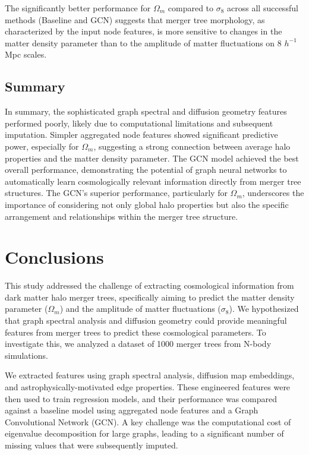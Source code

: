 \documentclass[twocolumn]{aastex631}
\begin{document}
The significantly better performance for $\Omega_m$ compared to $\sigma_8$ across all successful methods (Baseline and GCN) suggests that merger tree morphology, as characterized by the input node features, is more sensitive to changes in the matter density parameter than to the amplitude of matter fluctuations on 8 $h^{-1}$Mpc scales.

\subsection{Summary}

In summary, the sophisticated graph spectral and diffusion geometry features performed poorly, likely due to computational limitations and subsequent imputation. Simpler aggregated node features showed significant predictive power, especially for $\Omega_m$, suggesting a strong connection between average halo properties and the matter density parameter. The GCN model achieved the best overall performance, demonstrating the potential of graph neural networks to automatically learn cosmologically relevant information directly from merger tree structures. The GCN's superior performance, particularly for $\Omega_m$, underscores the importance of considering not only global halo properties but also the specific arrangement and relationships within the merger tree structure.

\section{Conclusions}
\label{sec:conclusions}
This study addressed the challenge of extracting cosmological information from dark matter halo merger trees, specifically aiming to predict the matter density parameter ($\Omega_m$) and the amplitude of matter fluctuations ($\sigma_8$). We hypothesized that graph spectral analysis and diffusion geometry could provide meaningful features from merger trees to predict these cosmological parameters. To investigate this, we analyzed a dataset of 1000 merger trees from N-body simulations.

We extracted features using graph spectral analysis, diffusion map embeddings, and astrophysically-motivated edge properties. These engineered features were then used to train regression models, and their performance was compared against a baseline model using aggregated node features and a Graph Convolutional Network (GCN). A key challenge was the computational cost of eigenvalue decomposition for large graphs, leading to a significant number of missing values that were subsequently imputed.
\end{document}
